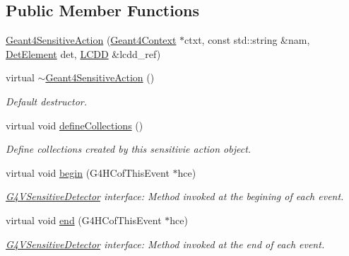 \subsection*{Public Member Functions}
\begin{DoxyCompactItemize}
\item 
\hyperlink{class_tests_1_1_geant4_sensitive_action_a0ed0ce7ae78a2d675419e5a1241b7570}{Geant4SensitiveAction} (\hyperlink{class_d_d4hep_1_1_simulation_1_1_geant4_context}{Geant4Context} $\ast$ctxt, const std::string \&nam, \hyperlink{class_d_d4hep_1_1_geometry_1_1_det_element}{DetElement} det, \hyperlink{class_d_d4hep_1_1_geometry_1_1_l_c_d_d}{LCDD} \&lcdd\_\-ref)
\item 
virtual \hyperlink{class_tests_1_1_geant4_sensitive_action_a64a85815a59aaada8e3f08a8f02eadf1}{$\sim$Geant4SensitiveAction} ()
\begin{DoxyCompactList}\small\item\em Default destructor. \item\end{DoxyCompactList}\item 
virtual void \hyperlink{class_tests_1_1_geant4_sensitive_action_a0083f23f8b2160bc6e03ccd11077182c}{defineCollections} ()
\begin{DoxyCompactList}\small\item\em Define collections created by this sensitivie action object. \item\end{DoxyCompactList}\item 
virtual void \hyperlink{class_tests_1_1_geant4_sensitive_action_a739fa2551e0217a591c5e99ae09d883a}{begin} (G4HCofThisEvent $\ast$hce)
\begin{DoxyCompactList}\small\item\em \hyperlink{class_g4_v_sensitive_detector}{G4VSensitiveDetector} interface: Method invoked at the begining of each event. \item\end{DoxyCompactList}\item 
virtual void \hyperlink{class_tests_1_1_geant4_sensitive_action_aeeb492550f054b8dd9f4780601fc1d66}{end} (G4HCofThisEvent $\ast$hce)
\begin{DoxyCompactList}\small\item\em \hyperlink{class_g4_v_sensitive_detector}{G4VSensitiveDetector} interface: Method invoked at the end of each event. \item\end{DoxyCompactList}\item 

\end{DoxyCompactItemize}
